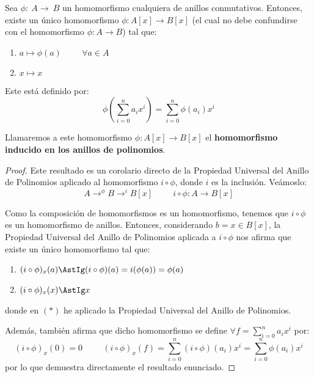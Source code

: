 \begin{teo}
    Sea $\phi:~A\longrightarrow~B$ un homomorfismo cualquiera de anillos conmutativos. Entonces, existe un único homomorfismo $\phi:A[x]\longrightarrow B[x]$ (el cual no debe confundirse con el homomorfismo $\phi:A\longrightarrow B$) tal que:
    \begin{enumerate}
        \item $a \longmapsto \phi(a) \hspace{1cm} \forall a \in A$
        \item $x \longmapsto x$
    \end{enumerate}

    Este está definido por:
    $$\phi\left( \sum_{i=0}^n a_i x^i \right) = \sum_{i=0}^n \phi(a_i) x^i$$
    
    Llamaremos a este homomorfismo $\phi:A[x]\longrightarrow B[x]$ el \textbf{homomorfismo inducido en los anillos de polinomios}.
\end{teo}
\begin{proof}
    Este resultado es un corolario directo de la Propiedad Universal del Anillo de Polinomios aplicado al homomorfismo $i\circ \phi$, donde $i$ es la inclusión. Veámoslo:
    $$A \mathop{\longrightarrow}^{\phi} B \mathop{\longrightarrow}^i B[x] \hspace{1cm} i \circ \phi:A\longrightarrow B[x]$$

    Como la composición de homomorfismos es un homomorfismo, tenemos que $i \circ \phi$ es un homomorfismo de anillos. Entonces, considerando $b = x \in B[x]$, la Propiedad Universal del Anillo de Polinomios aplicada a $i \circ \phi$ nos afirma que existe un único homomorfismo tal que:
    \begin{enumerate}
        \item $(i\circ \phi)_x(a) \AstIg (i\circ \phi)(a) = i(\phi(a))=\phi(a)$
        \item $(i\circ \phi)_x(x) \AstIg x$
    \end{enumerate}
    donde en $(\ast)$ he aplicado la Propiedad Universal del Anillo de Polinomios.

    Además, también afirma que dicho homomorfismo se define $\forall f=\sum_{i=0}^n a_ix^i$ por:
    \begin{equation*}
        (i\circ \phi)_x(0) = 0 \hspace{1cm}
        (i\circ \phi)_x(f) = \sum_{i=0}^n (i\circ \phi)(a_i)x^i = \sum_{i=0}^n \phi(a_i)x^i
    \end{equation*}
    por lo que demuestra directamente el resultado enunciado.
\end{proof}

